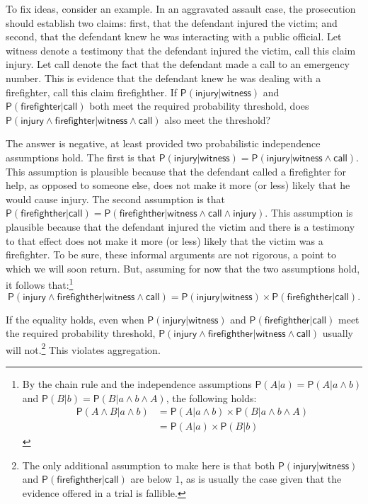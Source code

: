 \documentclass[
  10pt,
  dvipsnames,enabledeprecatedfontcommands]{scrartcl}
\newcommand{\pr}[1]{\ensuremath{\mathsf{P}(#1)}}
\begin{document}
To fix ideas, consider an example. In an aggravated assault case, the
prosecution should establish two claims: first, that the defendant
injured the victim; and second, that the defendant knew he was
interacting with a public official. Let \textsf{witness} denote a
testimony that the defendant injured the victim, call this claim
\textsf{injury}. Let \textsf{call} denote the fact that the defendant
made a call to an emergency number. This is evidence that the defendant
knew he was dealing with a firefighter, call this claim
\textsf{firefighther}. If
\(\pr{\textsf{injury} \vert \textsf{witness}}\) and
\(\pr{\textsf{firefighter} \vert \textsf{call} }\) both meet the
required probability threshold, does
\(\pr{\textsf{injury} \wedge \textsf{firefighter} \vert \textsf{witness} \wedge \textsf{call}}\)
also meet the threshold?

The answer is negative, at least provided two probabilistic independence
assumptions hold. The first is that
\(\pr{\textsf{injury} \vert \textsf{witness}}=\pr{\textsf{injury} \vert \textsf{witness} \wedge \textsf{call}}\).
This assumption is plausible because that the defendant called a
firefighter for help, as opposed to someone else, does not make it more
(or less) likely that he would cause injury. The second assumption is
that
\(\pr{\textsf{firefighther} \vert \textsf{call} }=\pr{\textsf{firefighther} \vert \textsf{witness} \wedge \textsf{call} \wedge \textsf{injury}}\).
This assumption is plausible because that the defendant injured the
victim and there is a testimony to that effect does not make it more (or
less) likely that the victim was a firefighter. To be sure, these
informal arguments are not rigorous, a point to which we will soon
return. But, assuming for now that the two assumptions hold, it follows
that:\footnote{By the chain rule and the independence assumptions
  \(\pr{A | a}=\pr{A | a \wedge b}\) and
  \(\pr{B | b}=\pr{B | a \wedge b \wedge A}\), the following holds:
  \begin{align*}
  \pr{A \wedge  B \vert a \wedge b}& =\pr{A \vert a \wedge b} \times \pr{B \vert  a \wedge b \wedge A}\\
   & = \pr{A \vert a} \times \pr{B \vert  b}
   \end{align*}}
\[\pr{\textsf{injury} \wedge \textsf{firefighther} \vert \textsf{witness} \wedge \textsf{call}}= \pr{\textsf{injury} \vert \textsf{witness}} \times \pr{\textsf{firefighther} \vert \textsf{call}}. \]

\noindent If the equality holds, even when
\(\pr{\textsf{injury} \vert \textsf{witness}}\) and
\(\pr{\textsf{firefighther} \vert \textsf{call} }\) meet the required
probability threshold,
\(\pr{\textsf{injury} \wedge \textsf{firefighther} \vert \textsf{witness} \wedge \textsf{call}}\)
usually will not.\footnote{The only additional assumption to make here
  is that both \(\pr{\textsf{injury} \vert \textsf{witness}}\) and
  \(\pr{\textsf{firefighther} \vert \textsf{call} }\) are below 1, as is
  usually the case given that the evidence offered in a trial is
  fallible.} This violates aggregation.
\end{document}
